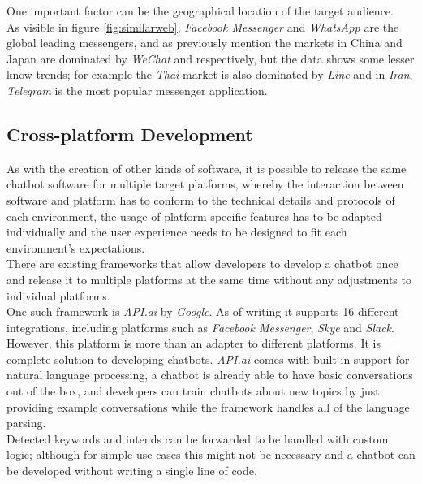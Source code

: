 One important factor can be the geographical location of the target audience.
\\
As visible in figure \ref{fig:similarweb}, \emph{Facebook Messenger} and \emph{WhatsApp} are the global leading messengers,
and as previously mention the markets in China and Japan are dominated by \emph{WeChat} and \emphLine respectively,
but the data shows some lesser know trends; for example the \emph{Thai} market is also dominated by\emph{ Line}
and in \emph{Iran}, \emph{Telegram} is the most popular messenger application.


\subsection{Cross-platform Development}
\label{crossplatform}

As with the creation of other kinds of software, it is possible to release the same chatbot software for multiple target platforms,
whereby the interaction between software and platform has to conform to the technical details and protocols of each environment, the usage of platform-specific features has to be adapted individually and the user experience needs to be designed to fit each environment's expectations.
\\

There are existing frameworks that allow developers to develop a chatbot once and release it to multiple platforms at the same time without any adjustments to individual platforms.
\\
One such framework is \emph{API.ai} by \emph{Google}.
As of writing it supports 16 different integrations, including platforms such as \emph{Facebook Messenger}, \emph{Skye} and \emph{Slack}\cite{apiai}.
However, this platform is more than an adapter to different platforms.
It is complete solution to developing chatbots.
\emph{API.ai} comes with built-in support for natural language processing,
a chatbot is already able to have basic conversations out of the box,
and developers can train chatbots about new topics by just providing example conversations while the framework handles all of the language parsing.
\\
Detected keywords and intends can be forwarded to be handled with custom logic;
although for simple use cases this might not be necessary and a chatbot can be developed without writing a single line of code.
\\

